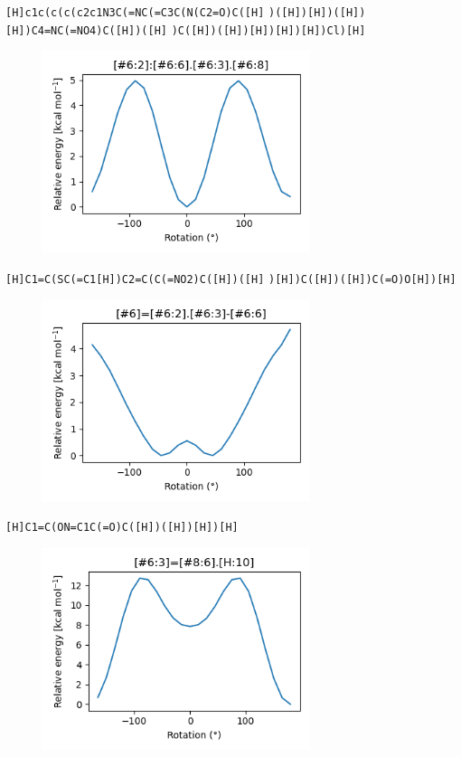 \documentclass{beamer}
\begin{document}
\begin{frame}[fragile]
\verb|[H]c1c(c(c(c2c1N3C(=NC(=C3C(N(C2=O)C([H]|
\verb|)([H])[H])([H])[H])C4=NC(=NO4)C([H])([H]|
\verb|)C([H])([H])[H])[H])[H])Cl)[H]|

\begin{figure}
    \includegraphics[width=0.7\textwidth,height=0.7\textheight,keepaspectratio]{plot01.png}
\end{figure}
\end{frame}
\begin{frame}[fragile]
\verb|[H]C1=C(SC(=C1[H])C2=C(C(=NO2)C([H])([H]|
\verb|)[H])C([H])([H])C(=O)O[H])[H]|

\begin{figure}
    \includegraphics[width=0.7\textwidth,height=0.7\textheight,keepaspectratio]{plot02.png}
\end{figure}
\end{frame}
\begin{frame}[fragile]
\verb|[H]C1=C(ON=C1C(=O)C([H])([H])[H])[H]|

\begin{figure}
    \includegraphics[width=0.7\textwidth,height=0.7\textheight,keepaspectratio]{plot03.png}
\end{figure}
\end{frame}
\end{document}
